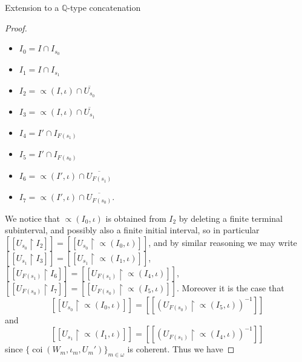\documentclass{amsart}
\theoremstyle{definition}\newtheorem{theorem}{Theorem}
\theoremstyle{definition}\newtheorem*{A}{Main Theorem}
\theoremstyle{definition}\newtheorem*{B}{Theorem \ref{elementaryequiv}}
\theoremstyle{definition}\newtheorem*{C}{Theorem \ref{continuous}}
\theoremstyle{definition}\newtheorem*{D}{Theorem \ref{bigisomorphism2}}
\theoremstyle{definition}\newtheorem{bigtheorem}{Main Theorem}
\numberwithin{theorem}{section}
\theoremstyle{definition}\newtheorem{corollary}[theorem]{Corollary}
\theoremstyle{definition}\newtheorem{proposition}[theorem]{Proposition}
\theoremstyle{definition}\newtheorem{definition}[theorem]{Definition}
\theoremstyle{definition}\newtheorem{question}[theorem]{Question}
\theoremstyle{definition}\newtheorem{example}[theorem]{Example}
\theoremstyle{definition}\newtheorem{remark}[theorem]{Remark}
\theoremstyle{definition}\newtheorem{note}[theorem]{Note}
\theoremstyle{definition}\newtheorem{lemma}[theorem]{Lemma}
\theoremstyle{definition}\newtheorem{fact}[theorem]{Fact}
\theoremstyle{definition}\newtheorem{define}[theorem]{Definition}
\theoremstyle{definition}\newtheorem{claim}[theorem]{Claim}
\theoremstyle{definition}\newtheorem{obs}[theorem]{Observation}
\theoremstyle{definition}\newtheorem{definitions}[theorem]{Definitions}
\newcommand{\coi}{\operatorname{coi}}
\begin{document}
\begin{section}{Extension to a $\mathbb{Q}$-type concatenation}
\begin{proof}
\begin{itemize}
\item $I_0 = I \cap I_{s_0}$

\item $I_1 = I \cap I_{s_1}$

\item $I_2 = \varpropto(I, \iota) \cap \overline{U_{s_0}}$

\item $I_3 = \varpropto(I, \iota) \cap \overline{U_{s_1}}$

\item $I_4 = I' \cap I_{F(s_1)}$

\item $I_5 = I' \cap I_{F(s_0)}$

\item $I_6 = \varpropto(I', \iota) \cap \overline{U_{F(s_1)}}$

\item $I_7 = \varpropto(I', \iota) \cap \overline{U_{F(s_0)}}$.


\end{itemize}

\noindent We notice that $\varpropto(I_0, \iota)$ is obtained from $I_2$ by deleting a finite terminal subinterval, and possibly also a finite initial interval, so in particular $[[U_{s_0} \upharpoonright I_2]] = [[U_{s_0} \upharpoonright \varpropto(I_0, \iota)]]$, and by similar reasoning we may write $[[U_{s_1} \upharpoonright I_3]] = [[U_{s_1} \upharpoonright \varpropto(I_1, \iota)]]$, $[[U_{F(s_1)} \upharpoonright I_6]] = [[U_{F(s_1)} \upharpoonright \varpropto(I_4, \iota)]]$, $[[U_{F(s_0)}\upharpoonright I_7]]=[[U_{F(s_0)}\upharpoonright \varpropto(I_5, \iota)]]$.  Moreover it is the case that $$[[U_{s_0} \upharpoonright \varpropto(I_0, \iota)]] = [[(U_{F(s_0)} \upharpoonright \varpropto(I_5, \iota))^{-1}]]$$ and $$[[U_{s_1}\upharpoonright \varpropto(I_1, \iota)]] = [[(U_{F(s_1)}\upharpoonright \varpropto(I_4, \iota))^{-1}]]$$ since $\{\coi(W_m, \iota_m, U_m')\}_{m \in \omega}$ is coherent.  Thus we have


\end{proof}
\end{section}
\end{document}
